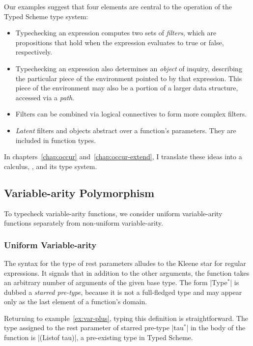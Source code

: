 \begin{schemeregion}
Our examples suggest that four elements are central to the
operation of the Typed Scheme type system:

\begin{itemize}
\item Typechecking an expression computes two sets of \emph{filters}, which
  are propositions that hold when the expression evaluates to 
  true or false, respectively.
\item Typechecking an expression also determines an \emph{object} of inquiry,
  describing the particular piece of the environment pointed to by that
  expression.  This piece of the environment may also be a portion of
  a larger data structure, accessed via a \emph{path}.
\item Filters can be combined via logical connectives to form more
  complex filters.
\item \emph{Latent} filters and objects  abstract over a function's parameters.
  They are included in function types.
\end{itemize}

In chapters~\ref{chap:occur} and~\ref{chap:occur-extend}, I translate
these ideas into a calculus, \lts, and its type system.

\subsection{Variable-arity Polymorphism}
\label{sec:varar-semi}
To typecheck variable-arity functions, we consider uniform
variable-arity functions separately from non-uniform variable-arity.    

\subsubsection{Uniform Variable-arity}

 The syntax  for the type of rest parameters alludes to
 the Kleene star for regular expressions.  It signals that in addition to
 the other arguments, the function takes an arbitrary number of arguments
 of the given base type.  The form \scheme|Type$^*$| is dubbed a {\em
 starred pre-type}, because it is not a full-fledged type and may appear
 only as the last element of a function's domain.

 Returning to example~\ref{ex:var-plus}, typing this definition is
 straightforward. The type assigned to the rest parameter of starred
 pre-type \scheme|tau$^*$| in the body of the function is
 \scheme|(Listof tau)|, a pre-existing type in Typed Scheme.


\end{schemeregion}
